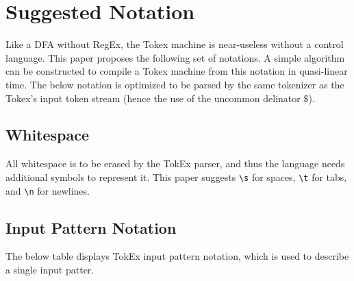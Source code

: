 \documentclass[8pt]{amsart}
\begin{document}
\section{Suggested Notation}

    Like a DFA without RegEx, the Tokex machine is near-useless
    without a control language. This paper proposes the
    following set of notations. A simple algorithm can be
    constructed to compile a Tokex machine from this notation in
    quasi-linear time. The below notation is optimized to be
    parsed by the same tokenizer as the Tokex's input token
    stream (hence the use of the uncommon delinator $\$$).

    \subsection{Whitespace}

    All whitespace is to be erased by the TokEx parser, and thus
    the language needs additional symbols to represent it. This
    paper suggests \verb|\s| for spaces, \verb|\t| for tabs, and
    \verb|\n| for newlines.

    \subsection{Input Pattern Notation}

    The below table displays TokEx input pattern notation, which
    is used to describe a single input patter.
\end{document}
